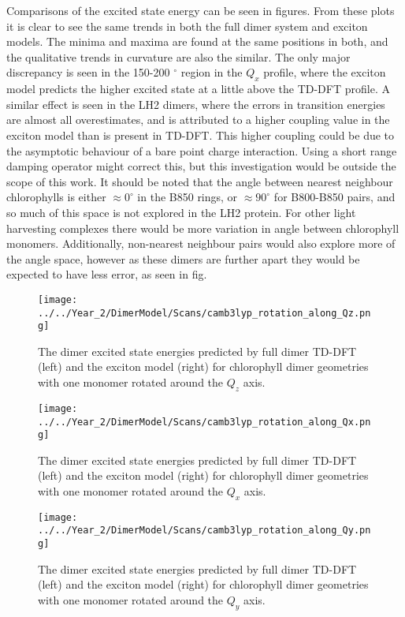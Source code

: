 Comparisons of the excited state energy can be seen in figures. From these plots
it is clear to see the same trends in both the full dimer system and exciton models.
The minima and maxima are found at the same positions in both, and the qualitative
trends in curvature are also the similar. The only major discrepancy is seen in
the 150-200 $^{\circ}$ region in the $Q_x$ profile, where the exciton model predicts
the higher excited state at a little above the TD-DFT profile. A similar effect
is seen in the LH2 dimers, where the errors in transition energies are almost all
overestimates, and is attributed to a higher coupling value in the exciton model
than is present in TD-DFT. This higher coupling could be due to the asymptotic behaviour
of a bare point charge interaction. Using a short range damping operator might correct
this, but this investigation would be outside the scope of this work.  
It should be noted that the angle between nearest neighbour chlorophylls is either
$\approx 0 ^{\circ}$ in the B850 rings, or $\approx 90 ^{\circ}$ for B800-B850 pairs, and so much
of this space is not explored in the LH2 protein. For other light harvesting complexes
there would be more variation in angle between chlorophyll monomers. Additionally,
non-nearest neighbour pairs would also explore more of the angle space, however
as these dimers are further apart they would be expected to have less error, as 
seen in fig.

\begin{figure}
    \centering
    \texttt{[image: ../../Year\_2/DimerModel/Scans/camb3lyp\_rotation\_along\_Qz.png]}
    \label{fig:camb3lyp_Qz_rotation}
    \caption{The dimer excited state energies predicted by full dimer TD-DFT (left)
    and the exciton model (right) for chlorophyll dimer geometries with one monomer
    rotated around the $Q_z$ axis.}
\end{figure}

\begin{figure}
    \centering
    \texttt{[image: ../../Year\_2/DimerModel/Scans/camb3lyp\_rotation\_along\_Qx.png]}
    \label{fig:camb3lyp_Qx_rotation}
    \caption{The dimer excited state energies predicted by full dimer TD-DFT (left)
    and the exciton model (right) for chlorophyll dimer geometries with one monomer
    rotated around the $Q_x$ axis.}
\end{figure}

\begin{figure}
    \centering
    \texttt{[image: ../../Year\_2/DimerModel/Scans/camb3lyp\_rotation\_along\_Qy.png]}
    \label{fig:camb3lyp_Qy_rotation}
    \caption{The dimer excited state energies predicted by full dimer TD-DFT (left)
    and the exciton model (right) for chlorophyll dimer geometries with one monomer
    rotated around the $Q_y$ axis.}
\end{figure}

